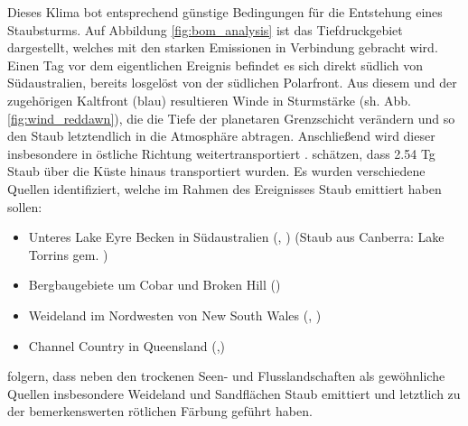 \documentclass[12pt,a4paper,onecolumn]{scrartcl}
\begin{document}
Dieses Klima bot entsprechend günstige Bedingungen für die Entstehung eines Staubsturms. Auf Abbildung \ref{fig:bom_analysis} ist das Tiefdruckgebiet dargestellt, welches mit den starken Emissionen in Verbindung gebracht wird. Einen Tag vor dem eigentlichen Ereignis befindet es sich direkt südlich von Südaustralien, bereits losgelöst von der südlichen Polarfront. Aus diesem und der zugehörigen Kaltfront (blau) resultieren Winde in Sturmstärke (sh. Abb. \ref{fig:wind_reddawn}), die die Tiefe der planetaren Grenzschicht verändern \citep{AlizadehChoobari.2012} und so den Staub letztendlich in die Atmosphäre abtragen. Anschließend wird dieser insbesondere in östliche Richtung weitertransportiert \citep{Leys.2011}.\citet{Leys.2011} schätzen, dass 2.54 Tg Staub über die Küste hinaus transportiert wurden.  Es wurden verschiedene Quellen identifiziert, welche im Rahmen des Ereignisses Staub emittiert haben sollen:
\begin{itemize}
\item Unteres Lake Eyre Becken in Südaustralien (\cite{Leys.2011}, \cite{Leys.2009}) (Staub aus Canberra: Lake Torrins gem. \cite{Deckker.2014})
\item Bergbaugebiete um Cobar und Broken Hill  (\cite{Leys.2011})
\item Weideland im Nordwesten von New South Wales (\cite{Leys.2011}, \cite{Leys.2009})
\item Channel Country in Queensland (\cite{Leys.2011},\cite{Leys.2009})
\end{itemize}
\citet{Leys.2011} folgern, dass neben den trockenen Seen- und Flusslandschaften als gewöhnliche Quellen insbesondere Weideland und Sandflächen Staub emittiert und letztlich zu der bemerkenswerten rötlichen Färbung geführt haben.
\end{document}
